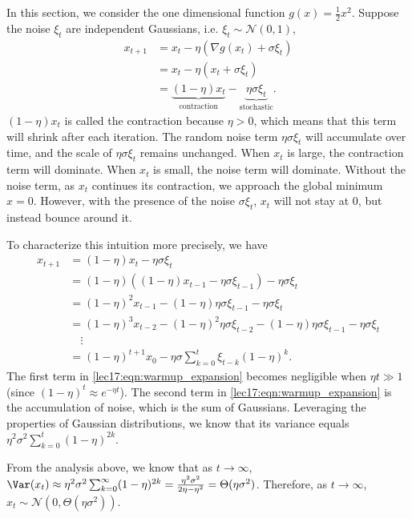 In this section, we consider the one dimensional function $g(x) = \frac{1}{2} x^2$. Suppose the noise $\xi_t$ are independent Gaussians, i.e. $\xi_t \sim \mathcal{N}(0,1)$,
\begin{align}
x_{t+1} &= x_t - \eta(\nabla g(x_{t}) + \sigma\xi_t)\\
&= x_t - \eta(x_{t} + \sigma\xi_t)\\
&= \underbrace{(1 - \eta)x_t}_{\text{contraction}} - \underbrace{\eta\sigma\xi_t}_{\text{stochastic}}\label{lec17:eqn:ou}.
\end{align}
$(1 - \eta)x_t$ is called the contraction because $\eta > 0$, which means that this term will shrink after each iteration. The random noise term $\eta\sigma\xi_t$ will accumulate over time, and the scale of $\eta\sigma\xi_t$ remains unchanged. When $x_t$ is large, the contraction term will dominate. When $x_t$ is small, the noise term will dominate. Without the noise term, as $x_t$ continues its contraction, we approach the global minimum $x = 0$. However, with the presence of the noise $\sigma\xi_t$, $x_t$ will not stay at $0$, but instead bounce around it. 

To characterize this intuition more precisely, we have 
\begin{align}
x_{t+1} &= (1 - \eta)x_t - \eta\sigma\xi_t\\
&= (1 - \eta) ((1 - \eta) x_{t - 1}  - \eta \sigma \xi_{t - 1}) - \eta \sigma \xi_t \\
&= (1 - \eta)^2 x_{t - 1} - (1 - \eta) \eta \sigma \xi_{t - 1} - \eta \sigma \xi_{t} \\
&= (1 - \eta)^3 x_{t - 2} - (1 - \eta)^2 \eta \sigma \xi_{t - 2} - (1 - \eta) \eta \sigma \xi_{t - 1} - \eta \sigma \xi_t \\
&\quad \vdots \\
&= (1 - \eta)^{t+1} x_0 - \eta\sigma\sum_{k=0}^{t} \xi_{t-k} (1 - \eta)^{k}. \label{lec17:eqn:warmup_expansion}
\end{align}
The first term in \eqref{lec17:eqn:warmup_expansion} becomes negligible when $\eta t \gg 1$ (since $(1 - \eta)^{t} \approx e^{-\eta t}$). The second term in \eqref{lec17:eqn:warmup_expansion} is the accumulation of noise, which is the sum of Gaussians. Leveraging the properties of Gaussian distributions, we know that its variance equals $\eta^2\sigma^2\sum_{k=0}^{t} (1 - \eta)^{2k}$.

From the analysis above, we know that as $t \rightarrow \infty$, $\Var(x_t) \approx \eta^2\sigma^2\sum_{k=0}^{\infty} (1 - \eta)^{2k} = \frac{\eta^2\sigma^2}{2\eta - \eta^2} = {\Theta}(\eta\sigma^2)$. Therefore, as $t \rightarrow \infty$, $x_t \sim \mathcal{N}(0, {\Theta}(\eta\sigma^2))$.

